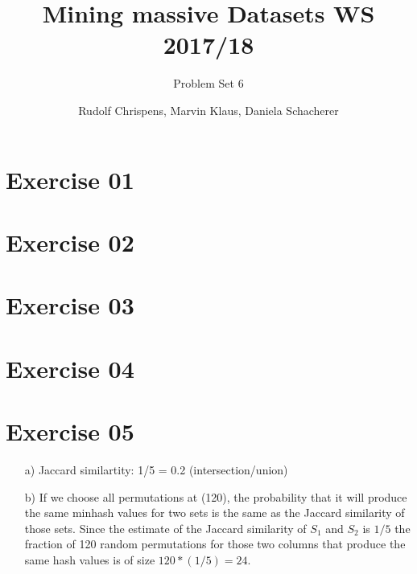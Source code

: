 \documentclass[11pt,a4paper]{scrartcl}
\title{Mining massive Datasets WS 2017/18}
\subtitle{Problem Set 6}
\author{Rudolf Chrispens, Marvin Klaus, Daniela Schacherer}
\begin{document}
\maketitle

\section*{Exercise 01}

\section*{Exercise 02}

\section*{Exercise 03}

\section*{Exercise 04}

\section*{Exercise 05}
\begin{itemize}
\item [a)] Jaccard similartity: 1/5 = 0.2 (intersection/union)
\item [b)] 
If we choose all permutations at (120), the probability that it will produce the same minhash values for two sets is the same as the Jaccard similarity of those sets. Since the estimate of the Jaccard similarity of $S_1$ and $S_2$ is $1/5$ the fraction of 120 random permutations for those two columns that produce the same hash values is of size $120 * (1/5) = 24$.
\end{itemize}
\end{document}
